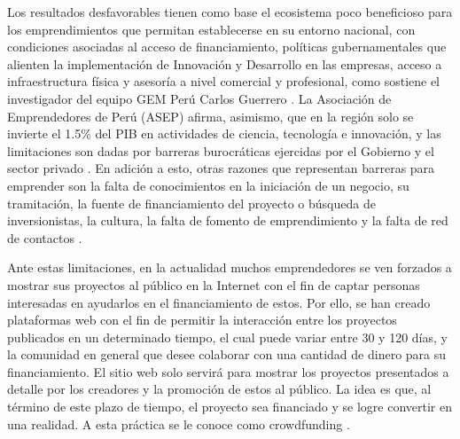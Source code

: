 Los resultados desfavorables tienen como base el ecosistema poco beneficioso para los emprendimientos que permitan establecerse en su entorno nacional, con condiciones asociadas al acceso de financiamiento, políticas gubernamentales que alienten la implementación de Innovación y Desarrollo en las empresas, acceso a infraestructura física y asesoría a nivel comercial y profesional, como sostiene el investigador del equipo GEM Perú Carlos Guerrero \parencite{cr_gestion2018emprend}. La Asociación de Emprendedores de Perú (ASEP) afirma, asimismo, que en la región solo se invierte el 1.5\% del PIB en actividades de ciencia, tecnología e innovación, y las limitaciones son dadas por barreras burocráticas ejercidas por el Gobierno y el sector privado \parencite{cr_aep2018emprend}. En adición a esto, otras razones que representan barreras para emprender son la falta de conocimientos en la iniciación de un negocio, su tramitación, la fuente de financiamiento del proyecto o búsqueda de inversionistas, la cultura, la falta de fomento de emprendimiento y la falta de red de contactos \parencite{cr_sandoval_barreras}.

Ante estas limitaciones, en la actualidad muchos emprendedores se ven forzados a mostrar sus proyectos al público en la Internet con el fin de captar personas interesadas en ayudarlos en el financiamiento de estos. Por ello, se han creado plataformas web con el fin de permitir la interacción entre los proyectos publicados en un determinado tiempo, el cual puede variar entre 30 y 120 días, y la comunidad en general que desee colaborar con una cantidad de dinero para su financiamiento. El sitio web solo servirá para mostrar los proyectos presentados a detalle por los creadores y la promoción de estos al público. La idea es que, al término de este plazo de tiempo, el proyecto sea financiado y se logre convertir en una realidad. A esta práctica se le conoce como crowdfunding \parencite{cr_uc_crowdfunding}.

